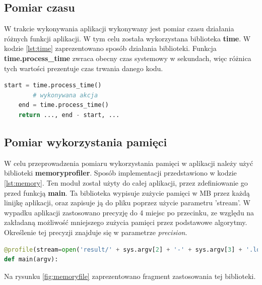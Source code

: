 \subsection{Pomiar czasu}
\label{ssec:timemethod}
W trakcie wykonywania aplikacji wykonywany jest pomiar czasu działania różnych funkcji aplikacji. W tym celu została wykorzystana biblioteka \textbf{time}. W kodzie \ref{lst:time} zaprezentowano sposób działania biblioteki. Funkcja \textbf{time.process\_time} zwraca obecny czas systemowy w sekundach, więc różnica tych wartości prezentuje czas trwania danego kodu.
\begin{lstlisting}[language=Python, caption=Pomiar czasu, label={lst:time}]
    start = time.process_time()
        # wykonywana akcja
    end = time.process_time()
    return ..., end - start, ...
\end{lstlisting}
\subsection{Pomiar wykorzystania pamięci}
\label{ssec:memorymethod}
W celu przeprowadzenia pomiaru wykorzystania pamięci w aplikacji należy użyć biblioteki \textbf{memory\-profiler}. Sposób implementacji przedstawiono w kodzie \ref{lst:memory}. Ten moduł został użyty do całej aplikacji, przez zdefiniowanie go przed funkcją \textbf{main}. Ta biblioteka wypisuje zużycie pamięci w MB przez każdą linijkę aplikacji, oraz zapisuje ją do pliku poprzez użycie parametru 'stream'. W wypadku aplikacji zastosowano precyzję do 4 miejsc po przecinku, ze względu na zakładaną możliwość mniejszego zużycia pamięci przez podstawowe algorytmy. Określenie tej precyzji znajduje się w parametrze \emph{precision}.
\begin{lstlisting}[language=Python, caption=Pomiar wykorzystania pamięci, label={lst:memory}]
@profile(stream=open('result/' + sys.argv[2] + '-' + sys.argv[3] + '.log','w+'), precision=4)
def main(argv):
\end{lstlisting}
Na rysunku \ref{fig:memoryfile} zaprezentowano fragment zastosowania tej biblioteki.

